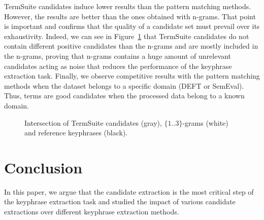       TermSuite candidates induce lower results than the pattern matching
      methods. However, the results are better than the ones obtained with
      n-grams. That point is important and confirms that the quality of a
      candidate set must prevail over its exhaustivity. Indeed, we can see in
      Figure~\ref{fig:quality_prevails_over_exhaustivity} that TermSuite
      candidates do not contain different positive candidates than the n-grams
      and are mostly included in the n-grams, proving that n-grams contains a
      huge amount of unrelevant candidates acting as noise that reduces the
      performance of the keyphrase extraction task. Finally, we observe
      competitive results with the pattern matching methods when the dataset
      belongs to a specific domain (DEFT or SemEval). Thus, terms are good
      candidates when the processed data belong to a known domain.
      \begin{figure}[t]
        \begin{center}
        \caption{Intersection of TermSuite candidates (gray), $\{1..3\}$-grams
                 (white) and reference keyphrases (black).
                 \label{fig:quality_prevails_over_exhaustivity}}
        \end{center}
      \end{figure}

\section{Conclusion}
\label{sec:conclusion}
  In this paper, we argue that the candidate extraction is the most critical
  step of the keyphrase extraction task and studied the impact of various
  candidate extractions over different keyphrase extraction methods.

